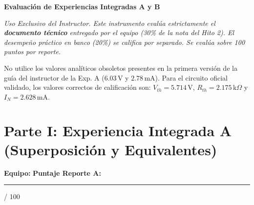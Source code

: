 \documentclass[11pt, a4paper]{article}
\begin{document}
\begin{tcolorbox}[colback=ucbblue!5!white, colframe=ucbblue, title=\textbf{Instrumento de Calificación Docente: Reportes Técnicos IEEE (Hito 2)}]
    \centering \textbf{Evaluación de Experiencias Integradas A y B}
\end{tcolorbox}

\noindent \textit{Uso Exclusivo del Instructor. Este instrumento evalúa estrictamente el \textbf{documento técnico} entregado por el equipo (30\% de la nota del Hito 2). El desempeño práctico en banco (20\%) se califica por separado. Se evalúa sobre 100 puntos por reporte.}

\vspace{0.4cm}
\begin{tcolorbox}[colback=warnred!5!white, colframe=warnred, title=\textbf{Advertencia Crítica sobre Valores de Referencia}]
No utilice los valores analíticos obsoletos presentes en la primera versión de la guía del instructor de la Exp. A ($6.03\,\text{V}$ y $2.78\,\text{mA}$). Para el circuito oficial validado, los valores correctos de calificación son: \textbf{$V_{th} = 5.714\,\text{V}$}, \textbf{$R_{th} = 2.175\,\text{k}\Omega$} y \textbf{$I_N = 2.628\,\text{mA}$}.
\end{tcolorbox}

\section*{Parte I: Experiencia Integrada A (Superposición y Equivalentes)}
\textbf{Equipo:} \hrulefill \quad \textbf{Puntaje Reporte A:} \rule{2cm}{0.4pt} / 100
\end{document}
